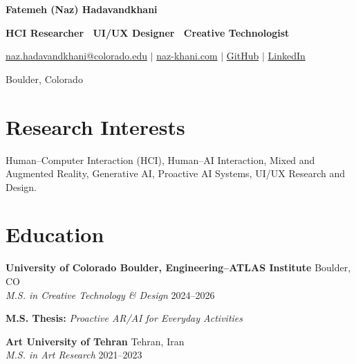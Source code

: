\documentclass[10pt,letterpaper]{article}
\newcommand{\cvitem}[4]{%
  {\bfseries\color{darkteal}#1}
  \hfill
  {\small\color{muted}#2}\\
  {\textit{#3}}
  \hfill
  {\small\color{muted}#4}%
  \vspace{4pt}%
}
\begin{document}

{\LARGE\bfseries\color{darkteal} Fatemeh (Naz) Hadavandkhani}

\vspace{3pt}

\textbf{
HCI Researcher
\textperiodcentered\
UI/UX Designer
\textperiodcentered\
Creative Technologist
}

\vspace{4pt}

{\small\color{linkteal}
\href{mailto:naz.hadavandkhani@colorado.edu}
{naz.hadavandkhani@colorado.edu}
\quad $\vert$ \quad
\href{https://naz-khani.com}
{naz-khani.com}
\quad $\vert$ \quad
\href{https://github.com/Saharnaz-Hdvnd}
{GitHub}
\quad $\vert$ \quad
\href{https://www.linkedin.com/in/naz-hadavandkhani-b99ba0164}
{LinkedIn}
}

\vspace{2pt}

{\small\color{muted} Boulder, Colorado}


\section{Research Interests}

Human--Computer Interaction (HCI),
Human--AI Interaction,
Mixed and Augmented Reality,
Generative AI,
Proactive AI Systems,
UI/UX Research and Design.


\section{Education}

\cvitem
{University of Colorado Boulder, Engineering--ATLAS Institute}
{Boulder, CO}
{M.S. in Creative Technology \& Design}
{2024--2026}

\textbf{M.S. Thesis:}
\textit{Proactive AR/AI for Everyday Activities}

\vspace{8pt}

\cvitem
{Art University of Tehran}
{Tehran, Iran}
{M.S. in Art Research}
{2021--2023}
\end{document}
